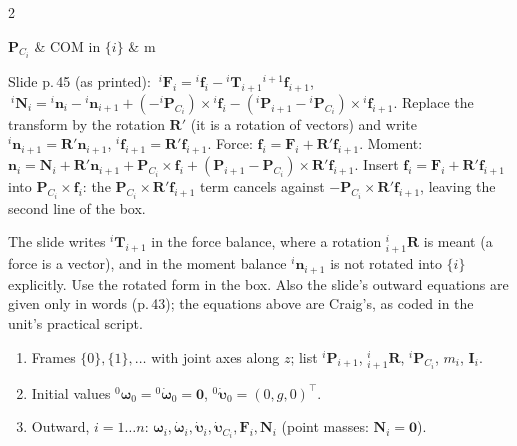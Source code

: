 \begin{multicols}{2}
\begin{fbx}[Inward pass, $i=n\to1$, with $\mathbf f_{n+1}=\mathbf n_{n+1}=\mathbf 0$ (free tool) \pg{44--45, Craig form}]
\begin{symbols}
$\mathbf P_{C_i}$ & COM in $\{i\}$ & m\\
\end{symbols}
\end{fbx}
\begin{deriv}
Slide p.\,45 (as printed): $\ {}^i\mathbf F_i={}^i\mathbf f_i-{}^i\mathbf T_{i+1}{}^{i+1}\mathbf f_{i+1}$, $\ {}^i\mathbf N_i={}^i\mathbf n_i-{}^i\mathbf n_{i+1}+(-{}^i\mathbf P_{C_i})\times{}^i\mathbf f_i-({}^i\mathbf P_{i+1}-{}^i\mathbf P_{C_i})\times{}^i\mathbf f_{i+1}$. Replace the transform by the rotation $\mathbf R'$ (it is a rotation of vectors) and write ${}^i\mathbf n_{i+1}=\mathbf R'\mathbf n_{i+1}$, ${}^i\mathbf f_{i+1}=\mathbf R'\mathbf f_{i+1}$. Force: $\mathbf f_i=\mathbf F_i+\mathbf R'\mathbf f_{i+1}$. Moment: $\mathbf n_i=\mathbf N_i+\mathbf R'\mathbf n_{i+1}+\mathbf P_{C_i}\times\mathbf f_i+(\mathbf P_{i+1}-\mathbf P_{C_i})\times\mathbf R'\mathbf f_{i+1}$. Insert $\mathbf f_i=\mathbf F_i+\mathbf R'\mathbf f_{i+1}$ into $\mathbf P_{C_i}\times\mathbf f_i$: the $\mathbf P_{C_i}\times\mathbf R'\mathbf f_{i+1}$ term cancels against $-\mathbf P_{C_i}\times\mathbf R'\mathbf f_{i+1}$, leaving the second line of the box.
\end{deriv}
\begin{slideerr}
The slide writes ${}^i\mathbf T_{i+1}$ in the force balance, where a rotation ${}^i_{i+1}\mathbf R$ is meant (a force is a vector), and in the moment balance ${}^i\mathbf n_{i+1}$ is not rotated into $\{i\}$ explicitly. Use the rotated form in the box. Also the slide's outward equations are given only in words (p.\,43); the equations above are Craig's, as coded in the unit's practical script.
\end{slideerr}
\begin{recipe}
\begin{enumerate}
\item Frames $\{0\},\{1\},\dots$ with joint axes along $z$; list ${}^{i}\mathbf P_{i+1}$, ${}^i_{i+1}\mathbf R$, ${}^i\mathbf P_{C_i}$, $m_i$, $\mathbf I_i$.
\item Initial values ${}^0\boldsymbol\omega_0={}^0\dot{\boldsymbol\omega}_0=\mathbf 0$, ${}^0\dot{\boldsymbol\upsilon}_0=(0,g,0)^\top$.
\item Outward, $i=1\ldots n$: $\boldsymbol\omega_i,\dot{\boldsymbol\omega}_i,\dot{\boldsymbol\upsilon}_i,\dot{\boldsymbol\upsilon}_{C_i},\mathbf F_i,\mathbf N_i$ (point masses: $\mathbf N_i=\mathbf 0$).

\end{enumerate}
\end{recipe}
\end{multicols}
